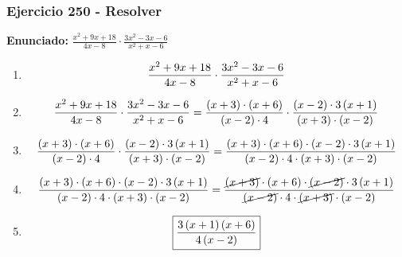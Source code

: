 \documentclass[11pt,a4paper]{article}
\newcommand{\fitmath}[1]{%
\[
\setbox0=\hbox{$\displaystyle #1$}%
\ifdim\wd0>\linewidth
\resizebox{\linewidth}{!}{$\displaystyle #1$}%
\else
#1%
\fi
\]
}
\begin{document}
\subsubsection*{Ejercicio 250 - Resolver}
\textbf{Enunciado:} $ \frac{x^{2} + 9 x + 18}{4 x - 8} \cdot \frac{3 x^{2} - 3 x - 6}{x^{2} + x - 6} $\par
\begin{enumerate}[leftmargin=2em]
\item \fitmath{\frac{x^{2} + 9 x + 18}{4 x - 8} \cdot \frac{3 x^{2} - 3 x - 6}{x^{2} + x - 6}}
\item \fitmath{\frac{x^{2} + 9 x + 18}{4 x - 8} \cdot \frac{3 x^{2} - 3 x - 6}{x^{2} + x - 6}= \frac{\left(x + 3\right)\cdot \left(x + 6\right)}{\left(x - 2\right)\cdot 4} \cdot \frac{\left(x - 2\right)\cdot 3 \left(x + 1\right)}{\left(x + 3\right)\cdot \left(x - 2\right)}}
\item \fitmath{\frac{\left(x + 3\right)\cdot \left(x + 6\right)}{\left(x - 2\right)\cdot 4}\cdot \frac{\left(x - 2\right)\cdot 3 \left(x + 1\right)}{\left(x + 3\right)\cdot \left(x - 2\right)}= \frac{\left(x + 3\right)\cdot \left(x + 6\right)\cdot \left(x - 2\right)\cdot 3 \left(x + 1\right)}{\left(x - 2\right)\cdot 4\cdot \left(x + 3\right)\cdot \left(x - 2\right)}}
\item \fitmath{\frac{\left(x + 3\right)\cdot \left(x + 6\right)\cdot \left(x - 2\right)\cdot 3 \left(x + 1\right)}{\left(x - 2\right)\cdot 4\cdot \left(x + 3\right)\cdot \left(x - 2\right)}= \frac{\cancel{\left(x + 3\right)}\cdot \left(x + 6\right)\cdot \cancel{\left(x - 2\right)}\cdot 3 \left(x + 1\right)}{\cancel{\left(x - 2\right)}\cdot 4\cdot \cancel{\left(x + 3\right)}\cdot \left(x - 2\right)}}
\item \fitmath{\boxed{\frac{3 \left(x + 1\right) \left(x + 6\right)}{4 \left(x - 2\right)}}}
\end{enumerate}

\vspace{0.12cm}
\end{document}
